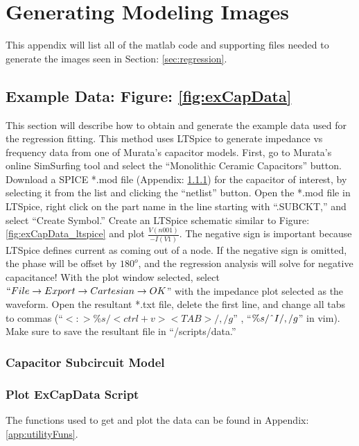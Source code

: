 \section{Generating Modeling Images}
\label{app:genModelingImages}
This appendix will list all of the matlab code and supporting files needed to generate the images seen in Section: \ref{sec:regression}.

\subsection{Example Data: Figure: \ref{fig:exCapData}}


This section will describe how to obtain and generate the example data used for the regression fitting. This method uses LTSpice to generate impedance vs frequency data from one of Murata's capacitor models. First, go to Murata's online SimSurfing tool \cite{simSurfing} and select the ``Monolithic Ceramic Capacitors'' button. Download a SPICE *.mod file (Appendix: \ref{app:subcir}) for the capacitor of interest, by selecting it from the list and clicking the ``netlist'' button. Open the *.mod file in LTSpice, right click on the part name in the line starting with ``.SUBCKT,'' and select ``Create Symbol.'' Create an LTSpice schematic similar to Figure: \ref{fig:exCapData_ltspice} and plot $\frac{V(n001)}{-I(V1)}$. The negative sign is important because LTSpice defines current as coming out of a node. If the negative sign is omitted, the phase will be offset by $180^o$, and the regression analysis will solve for negative capacitance! With the plot window selected, select  $``File\rightarrow Export\rightarrow Cartesian\rightarrow OK$'' with the impedance plot selected as the waveform. Open the resultant *.txt file, delete the first line, and change all tabs to commas (``$<:>\%s/<ctrl+v><TAB>/,/g$'' , ``$\%s/\string^I/,/g$'' in vim). Make sure to save the resultant file in ``/scripts/data.''

\subsubsection{Capacitor Subcircuit Model}
\label{app:subcir}


\subsubsection{Plot ExCapData Script}
The functions used to get and plot the data can be found in Appendix: \ref{app:utilityFuns}.



